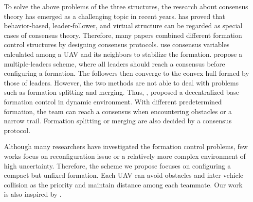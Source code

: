 To solve the above problems of the three structures, the research about consensus theory has emerged as a challenging topic in recent years. \citet{ren2007consensus} has proved that behavior-based, leader-follower, and virtual structure can be regarded as special cases of consensus theory. Therefore, many papers combined different formation control structures by designing consensus protocols. \citet{7419717} use consensus variables calculated among a UAV and its neighbors to stabilize the formation. \citet{8295262} propose a multiple-leaders scheme, where all leaders should reach a consensus before configuring a formation. The followers then converge to the convex hull formed by those of leaders. However, the two methods are not able to deal with problems such as formation splitting and merging. Thus, \citet{7487747}, \citet{8793765} proposed a decentralized base formation control in dynamic environment. With different predetermined formation, the team can reach a consensus when encountering obstacles or a narrow trail. Formation splitting or merging are also decided by a consensus protocol.

Although many researchers have investigated the formation control problems, few works focus on reconfiguration issue or a relatively more complex environment of high uncertainty. Therefore, the scheme we propose focuses on configuring a compact but unfixed formation. Each UAV can avoid obstacles and inter-vehicle collision as the priority and maintain distance among each teammate. Our work is also inspired by \citep{5069925}.
